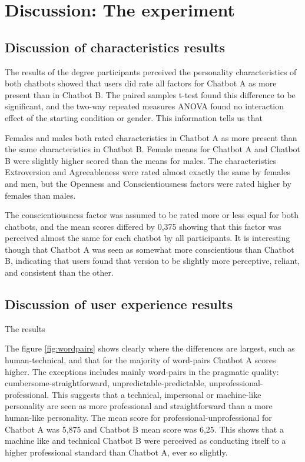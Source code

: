 \section{Discussion: The experiment}

\subsection{Discussion of characteristics results}
The results of the degree participants perceived the personality characteristics of both chatbots showed that users did rate all factors for Chatbot A as more present than in Chatbot B. The paired samples t-test found this difference to be significant, and the two-way repeated measures ANOVA found no interaction effect of the starting condition or gender. This information tells us that

Females and males both rated characteristics in Chatbot A as more present than the same characteristics in Chatbot B. Female means for Chatbot A and Chatbot B were slightly higher scored than the means for males. The characteristics Extroversion and Agreeableness were rated almost exactly the same by females and men, but the Openness and Conscientiousness factors were rated higher by females than males. 

The conscientiousness factor was assumed to be rated more or less equal for both chatbots, and the mean scores differed by 0,375 showing that this factor was perceived almost the same for each chatbot by all participants. It is interesting though that Chatbot A was seen as somewhat more conscientious than Chatbot B, indicating that users found that version to be slightly more perceptive, reliant, and consistent than the other. 

\subsection{Discussion of user experience results}
The results

The figure \ref{fig:wordpairs} shows clearly where the differences are largest, such as human-technical, and that for the majority of word-pairs Chatbot A scores higher. The exceptions includes mainly word-pairs in the pragmatic quality: cumbersome-straightforward, unpredictable-predictable, unprofessional-professional. This suggests that a technical, impersonal or machine-like personality are seen as more professional and straightforward than a more human-like personality. The mean score for professional-unprofessional for Chatbot A was 5,875 and Chatbot B mean score was 6,25. This shows that a machine like and technical Chatbot B were perceived as conducting itself to a higher professional standard than Chatbot A, ever so slightly.

